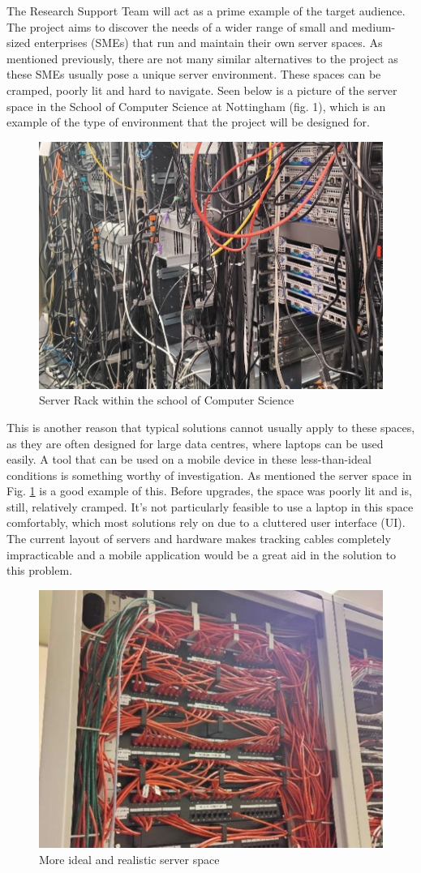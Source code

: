 \documentclass [11pt,a4paper]{article}
\begin{document}
The Research Support Team will act as a prime example of the target audience. The project aims to discover the needs of a wider range of small and medium-sized enterprises (SMEs) that run and maintain their own server spaces. As mentioned previously, there are not many similar alternatives to the project as these SMEs usually pose a unique server environment. These spaces can be cramped, poorly lit and hard to navigate. Seen below is a picture of the server space in the School of Computer Science at Nottingham (fig. 1), which is an example of the type of environment that the project will be designed for.
\begin{figure}[H]
    \centering
    \includegraphics[width=0.50\linewidth]{images/server_racks.jpg}
    \caption{Server Rack within the school of Computer Science}
    \label{fig:server_rack}
\end{figure}

This is another reason that typical solutions cannot usually apply to these spaces, as they are often designed for large data centres, where laptops can be used easily. A tool that can be used on a mobile device in these less-than-ideal conditions is something worthy of investigation. As mentioned the server space in Fig. \ref{fig:server_rack} is a good example of this. Before upgrades, the space was poorly lit and is, still, relatively cramped. It’s not particularly feasible to use a laptop in this space comfortably, which most solutions rely on due to a cluttered user interface (UI). The current layout of servers and hardware makes tracking cables completely impracticable and a mobile application would be a great aid in the solution to this problem. 

\begin{figure}[H]
    \centering
    \includegraphics[width=0.55\linewidth]{images/server_racks_clean.jpg}
    \caption{More ideal and realistic server space}
    \label{fig:ideal_server_space}
\end{figure}
\end{document}
